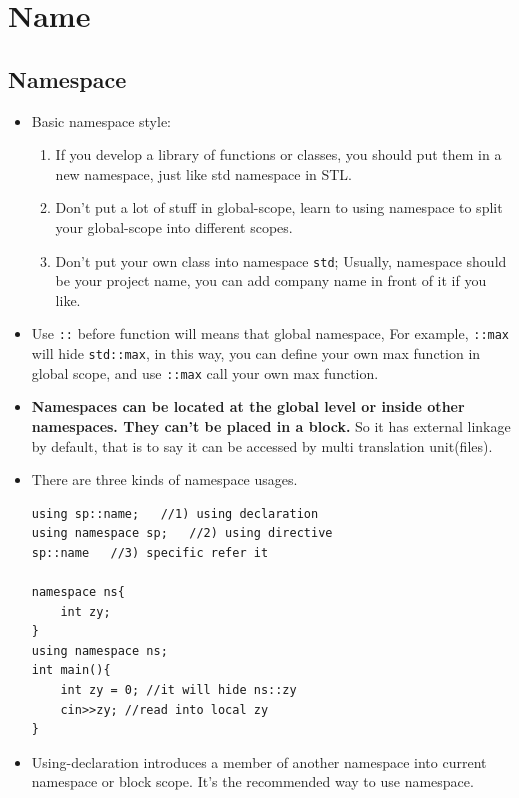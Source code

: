 \documentclass[a4paper,11pt,twoside]{book}
\begin{document}
\section{Name}
\subsection{Namespace}

\begin{itemize}
	\item Basic namespace style:
	\begin{enumerate}
		\item If you develop a library of functions or classes, you should put them in a new namespace, just like std namespace in STL.
		
		\item Don't put a lot of stuff in global-scope, learn to using namespace to split your global-scope into different scopes. 
		
		\item Don't put your own class into namespace \texttt{std}; Usually, namespace should be your project name, you can add company name in front of it if you like.
	\end{enumerate}
	
	
	\item Use \texttt{::} before function will means that global namespace, For example, \texttt{::max} will hide \texttt{std::max}, in this way, you can define your own max function in global scope, and use \texttt{::max} call your own max function. 
	

	\item \textbf{Namespaces can be located at the global level or inside other namespaces. They can't be placed in a block.} So it has external linkage by default, that is to say it can be accessed by multi translation unit(files).


	\item There are three kinds of namespace usages.
\begin{lstlisting}[numbers = none]
using sp::name;   //1) using declaration
using namespace sp;   //2) using directive
sp::name   //3) specific refer it
	
namespace ns{
	int zy;
}
using namespace ns;
int main(){
	int zy = 0; //it will hide ns::zy
	cin>>zy; //read into local zy
}
\end{lstlisting}
	
	\item Using-declaration introduces a member of another namespace into current namespace or block scope. It's the recommended way to use namespace. 
	

\end{itemize}
\end{document}
